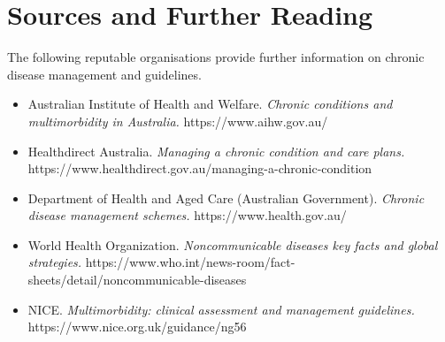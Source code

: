 \section*{Sources and Further Reading}
The following reputable organisations provide further information on chronic disease management and guidelines.
\begin{itemize}
    \item Australian Institute of Health and Welfare. \textit{Chronic conditions and multimorbidity in Australia.} https://www.aihw.gov.au/
    \item Healthdirect Australia. \textit{Managing a chronic condition and care plans.} https://www.healthdirect.gov.au/managing-a-chronic-condition
    \item Department of Health and Aged Care (Australian Government). \textit{Chronic disease management schemes.} https://www.health.gov.au/
    \item World Health Organization. \textit{Noncommunicable diseases key facts and global strategies.} https://www.who.int/news-room/fact-sheets/detail/noncommunicable-diseases
    \item NICE. \textit{Multimorbidity: clinical assessment and management guidelines.} https://www.nice.org.uk/guidance/ng56
\end{itemize}
